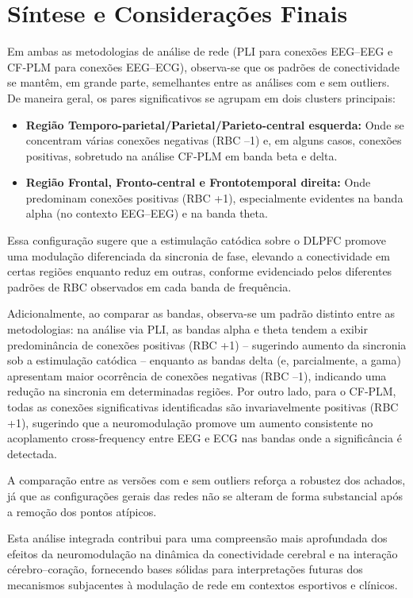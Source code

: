 \section{Síntese e Considerações Finais}

Em ambas as metodologias de análise de rede (PLI para conexões EEG–EEG e CF‐PLM para conexões EEG–ECG), observa-se que os padrões de conectividade se mantêm, em grande parte, semelhantes entre as análises com e sem outliers. De maneira geral, os pares significativos se agrupam em dois clusters principais: 
\begin{itemize}
    \item \textbf{Região Temporo-parietal/Parietal/Parieto-central esquerda:} Onde se concentram várias conexões negativas (RBC –1) e, em alguns casos, conexões positivas, sobretudo na análise CF‐PLM em banda beta e delta.
    \item \textbf{Região Frontal, Fronto-central e Frontotemporal direita:} Onde predominam conexões positivas (RBC +1), especialmente evidentes na banda alpha (no contexto EEG–EEG) e na banda theta.
\end{itemize}

Essa configuração sugere que a estimulação catódica sobre o DLPFC promove uma modulação diferenciada da sincronia de fase, elevando a conectividade em certas regiões enquanto reduz em outras, conforme evidenciado pelos diferentes padrões de RBC observados em cada banda de frequência.

Adicionalmente, ao comparar as bandas, observa-se um padrão distinto entre as metodologias: na análise via PLI, as bandas alpha e theta tendem a exibir predominância de conexões positivas (RBC +1) – sugerindo aumento da sincronia sob a estimulação catódica – enquanto as bandas delta (e, parcialmente, a gama) apresentam maior ocorrência de conexões negativas (RBC –1), indicando uma redução na sincronia em determinadas regiões. Por outro lado, para o CF‐PLM, todas as conexões significativas identificadas são invariavelmente positivas (RBC +1), sugerindo que a neuromodulação promove um aumento consistente no acoplamento cross-frequency entre EEG e ECG nas bandas onde a significância é detectada.

A comparação entre as versões com e sem outliers reforça a robustez dos achados, já que as configurações gerais das redes não se alteram de forma substancial após a remoção dos pontos atípicos.

Esta análise integrada contribui para uma compreensão mais aprofundada dos efeitos da neuromodulação na dinâmica da conectividade cerebral e na interação cérebro–coração, fornecendo bases sólidas para interpretações futuras dos mecanismos subjacentes à modulação de rede em contextos esportivos e clínicos.